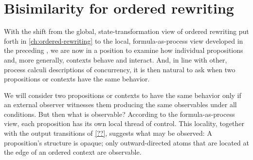 \chapter{Bisimilarity for ordered rewriting}\label{ch:ordered-bisimilarity}

With the shift from the global, state-transformation view of ordered rewriting put forth in \cref{ch:ordered-rewriting} to the local, formula-as-process view developed in the preceding , we are now in a position to examine how individual propositions and, more generally, contexts behave and interact.
And, in line with other, process calculi descriptions of concurrency, it is then natural to ask when two propositions or contexts have the same behavior.

We will consider two propositions or contexts to have the same behavior only if an external observer witnesses them producing the same observables under all conditions.%
But then what is observable?
According to the formula-as-process view, each proposition has its own local thread of control.
This locality, together with the output transitions of \cref{??}, suggests what may be observed:
A proposition's structure is opaque; only outward-directed atoms that are located at the edge of an ordered context are observable.



